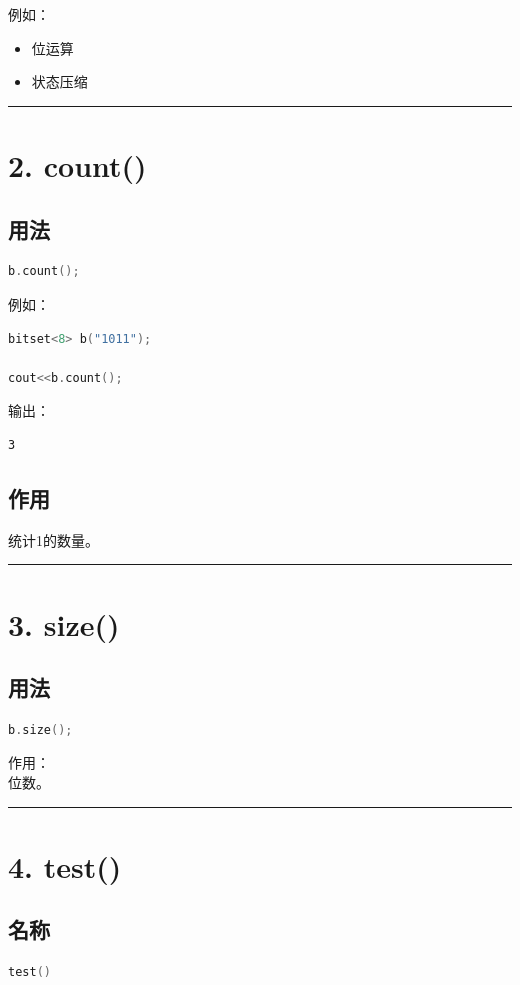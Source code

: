 \documentclass[9pt,twocolumn]{extarticle}
\begin{document}
例如：
\begin{itemize}
    \item 位运算
    \item 状态压缩
\end{itemize}

\noindent\rule{\linewidth}{0.4pt}

\section{2. count()}

\subsection{用法}
\begin{lstlisting}[language=C++]
b.count();
\end{lstlisting}
例如：
\begin{lstlisting}[language=C++]
bitset<8> b("1011");

cout<<b.count();
\end{lstlisting}
输出：
\begin{lstlisting}
3
\end{lstlisting}

\subsection{作用}
统计1的数量。

\noindent\rule{\linewidth}{0.4pt}

\section{3. size()}

\subsection{用法}
\begin{lstlisting}[language=C++]
b.size();
\end{lstlisting}
作用：\\
位数。

\noindent\rule{\linewidth}{0.4pt}

\section{4. test()}

\subsection{名称}
\begin{lstlisting}[language=C++]
test()
\end{lstlisting}
\end{document}
